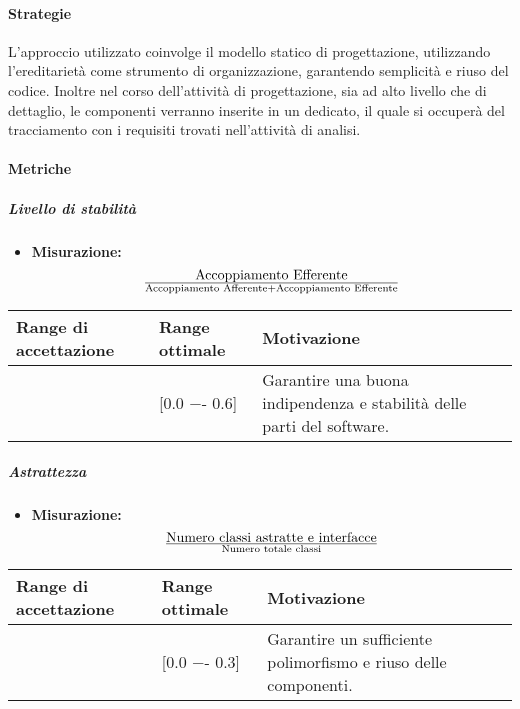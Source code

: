 \paragraph{Strategie}
L'approccio utilizzato coinvolge il modello statico di progettazione, utilizzando l'ereditarietà come strumento di organizzazione, garantendo semplicità e riuso del codice.
Inoltre nel corso dell'attività di progettazione, sia ad alto livello che di dettaglio, le componenti verranno inserite in un  dedicato, il quale si occuperà del tracciamento con i requisiti trovati nell'attività di analisi.


\paragraph{Metriche}

\subparagraph{Livello di stabilità}

\begin{itemize}
\item \textbf{Misurazione:} 
\begin{displaymath}
{\text{Accoppiamento Efferente}}\over{\text{Accoppiamento Afferente} + \text{Accoppiamento Efferente}}
\end{displaymath} 
\end{itemize}

\begin{center}
		\begin{tabular}{|P{2.5cm}|P{2.5cm}|P{6cm}|}
		\hline
			\textbf{Range di accettazione}	& \textbf{Range ottimale} & \textbf{Motivazione} \\
			\hline
			[0.0 −- 1] & [0.0 −- 0.6] &	Garantire una buona indipendenza e stabilità delle parti del software. \\
			\hline
			\end{tabular}
\end{center}

\subparagraph{Astrattezza}

\begin{itemize}
\item \textbf{Misurazione:}
\begin{displaymath}
{\text{Numero classi astratte e interfacce}}\over{\text{Numero totale classi}}
\end{displaymath}
\end{itemize}

\begin{center}
		\begin{tabular}{|P{2.5cm}|P{2.5cm}|P{6cm}|}
		\hline
			\textbf{Range di accettazione}	& \textbf{Range ottimale} & \textbf{Motivazione} \\
			\hline
			[0.0 −- 0.8] & [0.0 −- 0.3] &	Garantire un sufficiente polimorfismo e riuso delle componenti. \\
			\hline
			\end{tabular}
\end{center}


